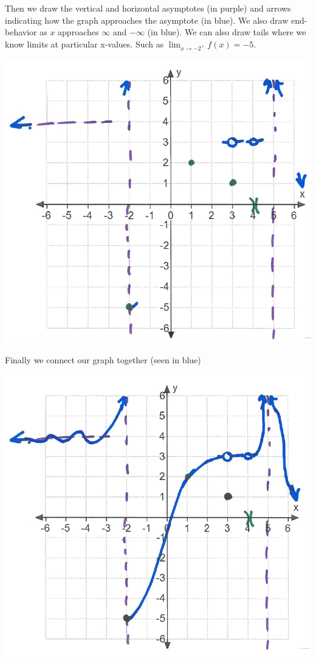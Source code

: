 \documentclass[nooutcomes,handout]{ximera}
\begin{document}
\begin{problem}
\begin{freeResponse}
	Then we draw the vertical  and horizontal asymptotes (in purple) and arrows indicating how the graph approaches the asymptote (in blue).  We also draw end-behavior as $x$ approaches $\infty$ and $-\infty$ (in blue).  We can also draw tails where we know limits at particular x-values.  Such as $ \lim_{x \to -2^+}f(x)=-5$.
	\begin{image}
	\includegraphics[scale = 0.4]{figure11.png}
	\end{image}

	Finally we connect our graph together (seen in blue)
	\begin{image}
    \includegraphics[scale = 0.4]{figure12.png}  
	\end{image}

  \end{freeResponse}
\end{problem}
\end{document}
